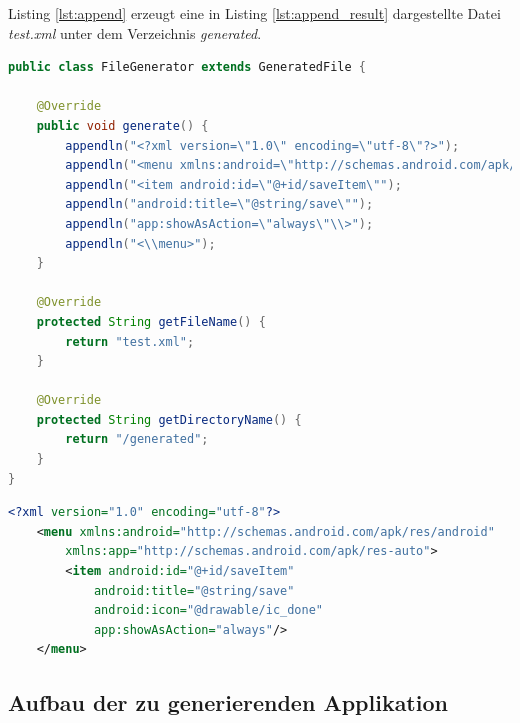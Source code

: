 \newpage

Listing \ref{lst:append} erzeugt eine in Listing \ref{lst:append_result} dargestellte Datei \textit{test.xml} unter dem Verzeichnis \textit{generated}.
\begin{lstlisting}[label=lst:append,
language=java,
firstnumber=1,
caption=Beispiel eine \textit{GeneratedFile}-Instanz zur Erzeugung einer \textit{XML}-Datei.]				   
public class FileGenerator extends GeneratedFile {

	@Override
	public void generate() {
		appendln("<?xml version=\"1.0\" encoding=\"utf-8\"?>");
		appendln("<menu xmlns:android=\"http://schemas.android.com/apk/res/android\" xmlns:app=\"http://schemas.android.com/apk/res-auto\">");
		appendln("<item android:id=\"@+id/saveItem\"");
		appendln("android:title=\"@string/save\"");
		appendln("app:showAsAction=\"always\"\\>");
		appendln("<\\menu>");
	}

	@Override
	protected String getFileName() {
		return "test.xml";
	}

	@Override
	protected String getDirectoryName() {
		return "/generated";
	}
}
\end{lstlisting}

\begin{lstlisting}[label=lst:append_result,
language=xml,
firstnumber=1,
caption=Erzeugte \textit{XML}-Datei durch den Quellcode von Listing \ref{lst:append}.]				   
<?xml version="1.0" encoding="utf-8"?>
	<menu xmlns:android="http://schemas.android.com/apk/res/android"
		xmlns:app="http://schemas.android.com/apk/res-auto">
		<item android:id="@+id/saveItem"
			android:title="@string/save"
			android:icon="@drawable/ic_done"
			app:showAsAction="always"/>
	</menu>
\end{lstlisting}

\subsection{Aufbau der zu generierenden Applikation}

